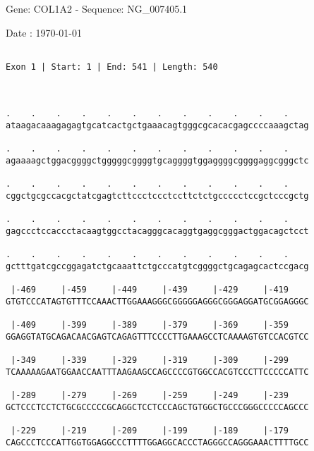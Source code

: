 \documentclass{article}
\begin{document}
\begin{center}
\begin{large}
 Gene: COL1A2 - Sequence: NG\_007405.1
 
 Date : \today
\end{large}
\end{center}
 \begin{Verbatim}
 
Exon 1 | Start: 1 | End: 541 | Length: 540



.    .    .    .    .    .    .    .    .    .    .    .    
ataagacaaagagagtgcatcactgctgaaacagtgggcgcacacgagccccaaagctag
                                                            
.    .    .    .    .    .    .    .    .    .    .    .    
agaaaagctggacggggctgggggcggggtgcaggggtggaggggcggggaggcgggctc
                                                            
.    .    .    .    .    .    .    .    .    .    .    .    
cggctgcgccacgctatcgagtcttccctccctccttctctgccccctccgctcccgctg
                                                            
.    .    .    .    .    .    .    .    .    .    .    .    
gagccctccaccctacaagtggcctacagggcacaggtgaggcgggactggacagctcct
                                                            
.    .    .    .    .    .    .    .    .    .    .    .    
gctttgatcgccggagatctgcaaattctgcccatgtcggggctgcagagcactccgacg
                                                            
 |-469     |-459     |-449     |-439     |-429     |-419    
GTGTCCCATAGTGTTTCCAAACTTGGAAAGGGCGGGGGAGGGCGGGAGGATGCGGAGGGC
                                                            
 |-409     |-399     |-389     |-379     |-369     |-359    
GGAGGTATGCAGACAACGAGTCAGAGTTTCCCCTTGAAAGCCTCAAAAGTGTCCACGTCC
                                                            
 |-349     |-339     |-329     |-319     |-309     |-299    
TCAAAAAGAATGGAACCAATTTAAGAAGCCAGCCCCGTGGCCACGTCCCTTCCCCCATTC
                                                            
 |-289     |-279     |-269     |-259     |-249     |-239    
GCTCCCTCCTCTGCGCCCCCGCAGGCTCCTCCCAGCTGTGGCTGCCCGGGCCCCCAGCCC
                                                            
 |-229     |-219     |-209     |-199     |-189     |-179    
CAGCCCTCCCATTGGTGGAGGCCCTTTTGGAGGCACCCTAGGGCCAGGGAAACTTTTGCC
                                                            

\end{Verbatim}
\end{document}
